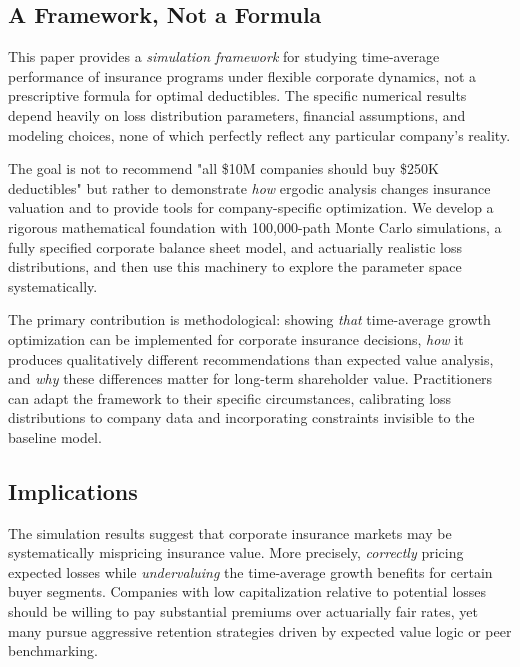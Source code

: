 \documentclass[11pt,letterpaper]{article}
\begin{document}
\subsection{A Framework, Not a Formula}

This paper provides a \emph{simulation framework} for studying time-average performance of insurance programs under flexible corporate dynamics, not a prescriptive formula for optimal deductibles. The specific numerical results depend heavily on loss distribution parameters, financial assumptions, and modeling choices, none of which perfectly reflect any particular company's reality.

The goal is not to recommend "all \$10M companies should buy \$250K deductibles" but rather to demonstrate \emph{how} ergodic analysis changes insurance valuation and to provide tools for company-specific optimization. We develop a rigorous mathematical foundation with 100,000-path Monte Carlo simulations, a fully specified corporate balance sheet model, and actuarially realistic loss distributions, and then use this machinery to explore the parameter space systematically.

The primary contribution is methodological: showing \emph{that} time-average growth optimization can be implemented for corporate insurance decisions, \emph{how} it produces qualitatively different recommendations than expected value analysis, and \emph{why} these differences matter for long-term shareholder value. Practitioners can adapt the framework to their specific circumstances, calibrating loss distributions to company data and incorporating constraints invisible to the baseline model.

\subsection{Implications}

The simulation results suggest that corporate insurance markets may be systematically mispricing insurance value. More precisely, \emph{correctly} pricing expected losses while \emph{undervaluing} the time-average growth benefits for certain buyer segments. Companies with low capitalization relative to potential losses should be willing to pay substantial premiums over actuarially fair rates, yet many pursue aggressive retention strategies driven by expected value logic or peer benchmarking.
\end{document}
